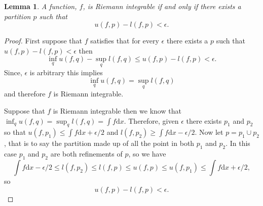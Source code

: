 \documentclass[11pt]{article}
\newtheorem{lem}[thm]{Lemma}
\theoremstyle{definition}
\theoremstyle{remark}
\begin{document}
\begin{lem}
A function, $f$, is Riemann integrable if and only if there exists a partition $p$ such that 
\[ u(f,p) - l(f,p) < \epsilon. \]
\end{lem}
\begin{proof}
First suppose that $f$ satisfies that for every $\epsilon$ there exists a $p$ such that $u(f,p)-l(f,p) < \epsilon$ then 
\[ \inf_q u(f,q) - \sup_q l(f,q) \leq u(f,p)-l(f,p) < \epsilon. \] Since, $\epsilon$ is arbitrary this implies \[ \inf_q u(f,q) = \sup_q l(f,q) \] and therefore $f$ is Riemann integrable.

Suppose that $f$ is Riemann integrable then we know that $\inf_q u(f,q) = \sup_q l(f,q) = \int f \mathrm{d}x$. Therefore, given $\epsilon$ there exists $p_1$ and $p_2$ so that $u(f,p_1) \leq \int f \mathrm{d}x + \epsilon/2$ and $l(f,p_2) \geq \int f \mathrm{d}x - \epsilon/2$. Now let $p = p_1 \cup p_2$, that is to say the partition made up of all the point in both $p_1$ and $p_2$. In this case $p_1$ and $p_2$ are both refinements of $p$, so we have
\[ \int f \mathrm{d}x - \epsilon/2 \leq l(f,p_2) \leq l(f,p) \leq u(f,p) \leq u(f,p_1) \leq \int f \mathrm{d}x + \epsilon/2, \] so
\[ u(f,p)-l(f,p) < \epsilon. \]
\end{proof}
\end{document}
